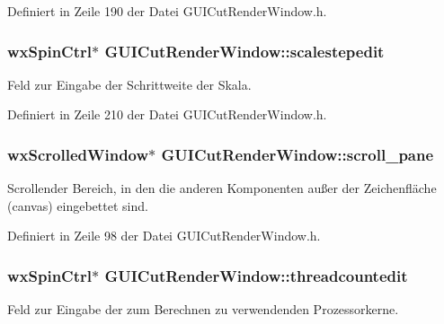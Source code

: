 Definiert in Zeile 190 der Datei G\-U\-I\-Cut\-Render\-Window.\-h.

\hypertarget{classGUICutRenderWindow_a4fbe9115e418be48a70eff31e94640ba}{
\subsubsection[{scalestepedit}]{\setlength{\rightskip}{0pt plus 5cm}wx\-Spin\-Ctrl$\ast$ G\-U\-I\-Cut\-Render\-Window\-::scalestepedit\hspace{0.3cm}{\ttfamily [private]}}}\label{classGUICutRenderWindow_a4fbe9115e418be48a70eff31e94640ba}
Feld zur Eingabe der Schrittweite der Skala. 

Definiert in Zeile 210 der Datei G\-U\-I\-Cut\-Render\-Window.\-h.

\hypertarget{classGUICutRenderWindow_a28c430f7145860ba3265fa9b8417923d}{
\subsubsection[{scroll\-\_\-pane}]{\setlength{\rightskip}{0pt plus 5cm}wx\-Scrolled\-Window$\ast$ G\-U\-I\-Cut\-Render\-Window\-::scroll\-\_\-pane\hspace{0.3cm}{\ttfamily [private]}}}\label{classGUICutRenderWindow_a28c430f7145860ba3265fa9b8417923d}
Scrollender Bereich, in den die anderen Komponenten außer der Zeichenfläche (canvas) eingebettet sind. 

Definiert in Zeile 98 der Datei G\-U\-I\-Cut\-Render\-Window.\-h.

\hypertarget{classGUICutRenderWindow_ae48406dc8c80240904ca7040b7b3fbf1}{
\subsubsection[{threadcountedit}]{\setlength{\rightskip}{0pt plus 5cm}wx\-Spin\-Ctrl$\ast$ G\-U\-I\-Cut\-Render\-Window\-::threadcountedit\hspace{0.3cm}{\ttfamily [private]}}}\label{classGUICutRenderWindow_ae48406dc8c80240904ca7040b7b3fbf1}
Feld zur Eingabe der zum Berechnen zu verwendenden Prozessorkerne. 

